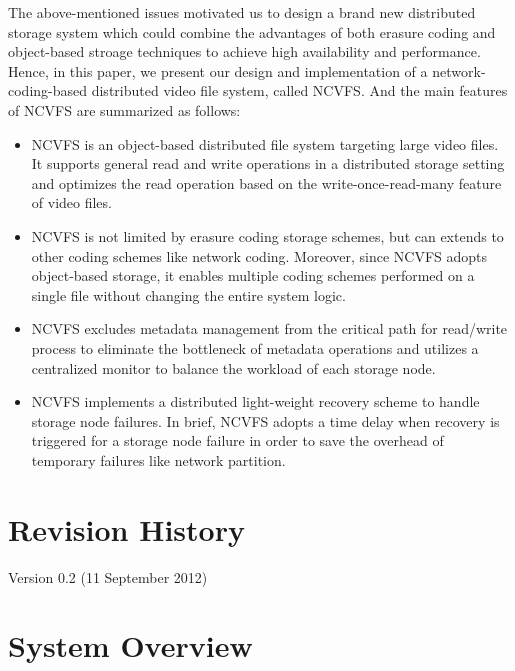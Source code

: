 \documentclass{article}
\begin{document}
The above-mentioned issues motivated us to design a brand new distributed storage
system which could combine the advantages of both erasure coding and object-based
stroage techniques to achieve high availability and performance. 
Hence, in this paper, we present our design and implementation of a 
network-coding-based distributed video file system, called NCVFS.  And 
the main features of NCVFS are summarized as follows:

\begin{itemize}

	\item NCVFS is an object-based distributed file system targeting 
		large video files. It supports general read and write operations 
		in a distributed storage setting and optimizes the read operation based
		on the write-once-read-many feature of video files.

	\item NCVFS is not limited by erasure coding storage schemes, but can extends
		to other coding schemes like network coding. Moreover, since NCVFS adopts
		object-based storage, it enables multiple coding schemes performed on a 
		single file without changing the entire system logic.

	\item NCVFS excludes metadata management from the critical path for
		read/write process to eliminate the bottleneck of metadata operations 
		and utilizes a centralized monitor to balance the workload of each
		storage node.

	\item NCVFS implements a distributed light-weight recovery scheme to handle
		storage node failures. In brief, NCVFS adopts a time delay when recovery
		is triggered for a storage node failure 
		in order to save the overhead of temporary failures like network partition.

\end{itemize}

\section{Revision History}
Version 0.2 (11 September 2012)

\section{System Overview}
\end{document}
